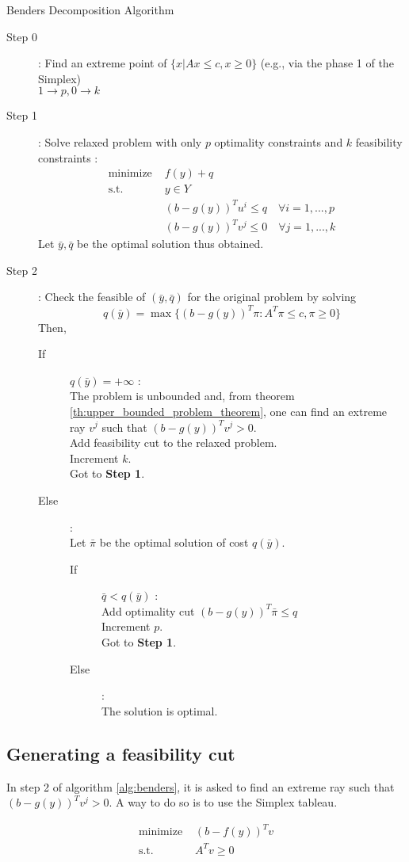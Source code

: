\begin{algorithm}
    \caption{Benders Decomposition Algorithm}
    \label{alg:benders}
    \begin{description}
        \item[Step 0] : Find an extreme point of $\{x|Ax\le c, x\ge 0\}$ (e.g., via the phase 1 of the Simplex)\\$1\rightarrow p, 0\rightarrow k$
        \item[Step 1] : Solve relaxed problem with only $p$ optimality constraints and $k$ feasibility constraints :
        \begin{align*}
            \textrm{minimize } & f(y) + q\\
            \textrm{s.t. } & y\in Y\\
            & (b-g(y))^Tu^i \le q\quad\forall i=1,...,p\\
            & (b-g(y))^Tv^j \le 0\quad\forall j=1,...,k
        \end{align*}
        Let $\bar y, \bar q$ be the optimal solution thus obtained. 
        \item[Step 2] : Check the feasible of $(\bar y, \bar q)$ for the original problem by solving \[ q(\bar y) = \max\{ (b-g(y))^T\pi : A^T\pi \le c, \pi\ge 0 \} \]
        Then,
        \begin{description}
            \item[If] $q(\bar y) = +\infty$ : \\
            The problem is unbounded and, from theorem \ref{th:upper_bounded_problem_theorem}, one can find an extreme ray $v^j$ such that $(b-g(y))^Tv^j > 0$. \\
            Add feasibility cut to the relaxed problem.\\
            Increment $k$. \\
            Got to \textbf{Step 1}.
            \item[Else] : \\
            Let $\bar\pi$ be the optimal solution of cost $q(\bar y)$. 
            \begin{description}
                \item[If] $\bar q < q(\bar y)$ :\\
                Add optimality cut $(b-g(y))^T\bar\pi\le q$\\
                Increment $p$.\\
                Got to \textbf{Step 1}.
                \item[Else] :\\
                The solution is optimal.
            \end{description}
        \end{description}
    \end{description}
\end{algorithm}

\subsection{Generating a feasibility cut}

In step 2 of algorithm \ref{alg:benders}, it is asked to find an extreme ray such that $(b-g(y))^Tv^j > 0$. A way to do so is to use the Simplex tableau. 

\begin{align*}
    \textrm{minimize } & (b-f(y))^Tv \\
    \textrm{s.t. } & A^Tv \ge 0
\end{align*}